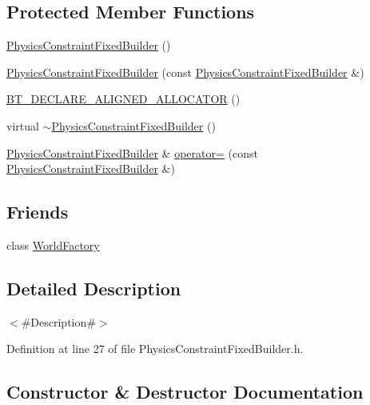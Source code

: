 \subsection*{Protected Member Functions}
\begin{DoxyCompactItemize}
\item 
\mbox{\hyperlink{classnjli_1_1_physics_constraint_fixed_builder_a099814f08a682c800facd7272f74e36d}{Physics\+Constraint\+Fixed\+Builder}} ()
\item 
\mbox{\hyperlink{classnjli_1_1_physics_constraint_fixed_builder_a27a735d0f935892d35beb1cda81508da}{Physics\+Constraint\+Fixed\+Builder}} (const \mbox{\hyperlink{classnjli_1_1_physics_constraint_fixed_builder}{Physics\+Constraint\+Fixed\+Builder}} \&)
\item 
\mbox{\hyperlink{classnjli_1_1_physics_constraint_fixed_builder_a7a030903bdabc4d48aed1a62b24eea9e}{B\+T\+\_\+\+D\+E\+C\+L\+A\+R\+E\+\_\+\+A\+L\+I\+G\+N\+E\+D\+\_\+\+A\+L\+L\+O\+C\+A\+T\+OR}} ()
\item 
virtual \mbox{\hyperlink{classnjli_1_1_physics_constraint_fixed_builder_a2d8bda3ee011d99923d26b49e02c02a6}{$\sim$\+Physics\+Constraint\+Fixed\+Builder}} ()
\item 
\mbox{\hyperlink{classnjli_1_1_physics_constraint_fixed_builder}{Physics\+Constraint\+Fixed\+Builder}} \& \mbox{\hyperlink{classnjli_1_1_physics_constraint_fixed_builder_a5390a28f6394c54c1f715a89768c7409}{operator=}} (const \mbox{\hyperlink{classnjli_1_1_physics_constraint_fixed_builder}{Physics\+Constraint\+Fixed\+Builder}} \&)
\end{DoxyCompactItemize}
\subsection*{Friends}
\begin{DoxyCompactItemize}
\item 
class \mbox{\hyperlink{classnjli_1_1_physics_constraint_fixed_builder_acb96ebb09abe8f2a37a915a842babfac}{World\+Factory}}
\end{DoxyCompactItemize}


\subsection{Detailed Description}
$<$\#\+Description\#$>$ 

Definition at line 27 of file Physics\+Constraint\+Fixed\+Builder.\+h.



\subsection{Constructor \& Destructor Documentation}
\mbox{\label{classnjli_1_1_physics_constraint_fixed_builder_a099814f08a682c800facd7272f74e36d}} 
